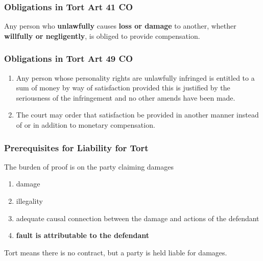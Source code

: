 \documentclass[11pt]{article}
\theoremstyle{definition}
\begin{document}
\subsubsection{Obligations in Tort Art 41 CO}
Any person who \textbf{unlawfully} causes \textbf{loss or damage} to another, whether \textbf{willfully or negligently}, is obliged to provide compensation.

\subsubsection{Obligations in Tort Art 49 CO}
\begin{enumerate}[label=\arabic* ]
	\item Any person whose personality rights are unlawfully infringed is entitled to a sum of money by way of satisfaction provided this is justified by the seriousness of the infringement and no other amends have been made.
	\item The court may order that satisfaction be provided in another manner instead of or in addition to monetary compensation.
\end{enumerate}

\subsubsection{Prerequisites for Liability for Tort}
The burden of proof is on the party claiming damages
\begin{enumerate}
	\item damage
	\item illegality
	\item adequate causal connection between the damage and actions of the defendant
	\item \textbf{fault is attributable to the defendant}
\end{enumerate}
Tort means there is no contract, but a party is held liable for damages.
\end{document}
